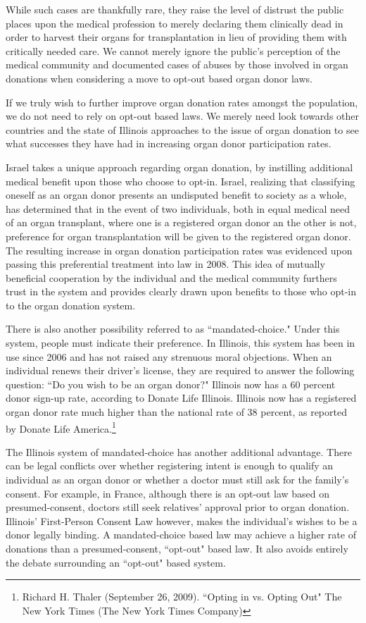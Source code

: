 \documentclass[letterpaper,10pt,twoside]{article}
\begin{document}
While such cases are thankfully rare, they raise the level of distrust the public places upon the medical profession to merely declaring them clinically dead in order to harvest their organs for transplantation  in lieu of providing them with critically needed care.  We cannot merely ignore the public's perception of the medical community and documented cases of abuses by those involved in organ donations when considering a move to opt-out based organ donor laws.

If we truly wish to further improve organ donation rates amongst the population, we do not need to rely on opt-out based laws.  We merely need look towards other countries and the state of Illinois approaches to the issue of organ donation to see what successes they have had in increasing organ donor participation rates.

Israel takes a unique approach regarding organ donation, by instilling additional medical benefit upon those who choose to opt-in.  Israel, realizing that classifying oneself as an organ donor presents an undisputed benefit to society as a whole, has determined that in the event of two individuals, both in equal medical need of an organ transplant, where one is a registered organ donor an the other is not, preference for organ transplantation will be given to the registered organ donor.  The resulting increase in organ donation participation rates was evidenced upon passing this preferential treatment into law in 2008.  This idea of mutually beneficial cooperation by the individual and the medical community furthers trust in the system and provides clearly drawn upon benefits to those who opt-in to the organ donation system.

There is also another possibility referred to as ``mandated-choice."  Under this system, people must indicate their preference.  In Illinois, this system has been in use since 2006 and has not raised any strenuous moral objections.  When an individual renews their driver's license, they are required to answer the following question: ``Do you wish to be an organ donor?"  Illinois now has a 60 percent donor sign-up rate, according to Donate Life Illinois.  Illinois now has a registered organ donor rate much higher than the national rate of 38 percent, as reported by Donate Life America.\footnote{Richard H. Thaler (September 26, 2009). ``Opting in vs. Opting Out" The New York Times (The New York Times Company)}

The Illinois system of mandated-choice has another additional advantage.  There can be legal conflicts over whether registering intent is enough to qualify an individual as an organ donor or whether a doctor must still ask for the family's consent. For example, in France, although there is an opt-out law based on presumed-consent, doctors still seek relatives' approval prior to organ donation.  Illinois' First-Person Consent Law however, makes the individual's wishes to be a donor legally binding.  A mandated-choice based  law may achieve a higher rate of donations than a presumed-consent, ``opt-out" based law.  It also avoids entirely the debate surrounding an ``opt-out" based system.
\end{document}
